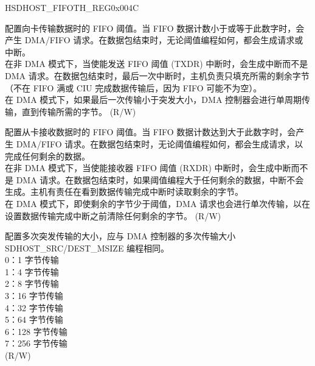 \begin{register}{H}{SDHOST\_FIFOTH\_REG}{0x004C}\label{regdesc:SDHOSTFIFOTHREG}
%
%
%
%
%
%
\regnewline%
\begin{regdesc}\begin{reglist}
\label{fielddesc:SDHOSTTXWMARK}\item [SDHOST\_TX\_WMARK] 配置向卡传输数据时的 FIFO 阈值。当 FIFO 数据计数小于或等于此数字时，会产生 DMA/FIFO 请求。在数据包结束时，无论阈值编程如何，都会生成请求或中断。\\
在非 DMA 模式下，当使能发送 FIFO 阈值 (TXDR) 中断时，会生成中断而不是 DMA 请求。在数据包结束时，最后一次中断时，主机负责只填充所需的剩余字节（不在 FIFO 满或 CIU 完成数据传输后，因为 FIFO 可能不为空）。\\
在 DMA 模式下，如果最后一次传输小于突发大小，DMA 控制器会进行单周期传输，直到传输所需的字节。 (R/W)
\label{fielddesc:SDHOSTRXWMARK}\item [SDHOST\_RX\_WMARK] 配置从卡接收数据时的 FIFO 阈值。当 FIFO 数据计数达到大于此数字时，会产生 DMA/FIFO 请求。在数据包结束时，无论阈值编程如何，都会生成请求，以完成任何剩余的数据。\\
在非 DMA 模式下，当使能接收器 FIFO 阈值 (RXDR) 中断时，会生成中断而不是 DMA 请求。在数据包结束时，如果阈值编程大于任何剩余的数据，中断不会生成。主机有责任在看到数据传输完成中断时读取剩余的字节。\\
在 DMA 模式下，即使剩余的字节少于阈值，DMA 请求也会进行单次传输，以在设置数据传输完成中断之前清除任何剩余的字节。 (R/W)
\label{fielddesc:SDHOSTDMAMULTIPLETRANSACTIONSIZE}\item [SDHOST\_DMA\_MULTIPLE\_TRANSACTION\_SIZE] 配置多次突发传输的大小，应与 DMA 控制器的多次传输大小 SDHOST\_SRC/DEST\_MSIZE 编程相同。\\
0：1 字节传输\\
1：4 字节传输\\
2：8 字节传输\\
3：16 字节传输\\
4：32 字节传输\\
5：64 字节传输\\
6：128 字节传输\\
7：256 字节传输\\ (R/W)
\end{reglist}\end{regdesc}
\end{register}


